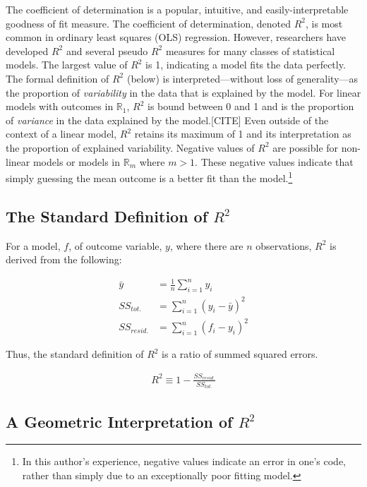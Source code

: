 \documentclass[conference,final,]{IEEEtran}
\begin{document}
The coefficient of determination is a popular, intuitive, and
easily-interpretable goodness of fit measure. The coefficient of
determination, denoted \(R^2\), is most common in ordinary least squares
(OLS) regression. However, researchers have developed \(R^2\) and
several pseudo \(R^2\) measures for many classes of statistical models.
The largest value of \(R^2\) is 1, indicating a model fits the data
perfectly. The formal definition of \(R^2\) (below) is
interpreted---without loss of generality---as the proportion of
\emph{variability} in the data that is explained by the model. For
linear models with outcomes in \(\mathbb{R}_1\), \(R^2\) is bound
between 0 and 1 and is the proportion of \emph{variance} in the data
explained by the model.{[}CITE{]} Even outside of the context of a
linear model, \(R^2\) retains its maximum of 1 and its interpretation as
the proportion of explained variability. Negative values of \(R^2\) are
possible for non-linear models or models in \(\mathbb{R}_m\) where
\(m > 1\). These negative values indicate that simply guessing the mean
outcome is a better fit than the model.\footnote{In this author's
  experience, negative values indicate an error in one's code, rather
  than simply due to an exceptionally poor fitting model.}

\hypertarget{the-standard-definition-of-r2}{%
\subsection{\texorpdfstring{The Standard Definition of
\(R^2\)}{The Standard Definition of R\^{}2}}\label{the-standard-definition-of-r2}}

For a model, \(f\), of outcome variable, \(y\), where there are \(n\)
observations, \(R^2\) is derived from the following:

\begin{align}
  \bar{y} &= \frac{1}{n}\sum_{i=1}^{n}y_i\\
  SS_{tot.} &= \sum_{i=1}^n{(y_i-\bar{y})^2}\\
  SS_{resid.} &= \sum_{i=1}^n{(f_i-y_i)^2}
\end{align}

Thus, the standard definition of \(R^2\) is a ratio of summed squared
errors.

\begin{align}
    R^2 \equiv 1 - \frac{SS_{resid.}}{SS_{tot.}}
\end{align}

\hypertarget{a-geometric-interpretation-of-r2}{%
\subsection{\texorpdfstring{A Geometric Interpretation of
\(R^2\)}{A Geometric Interpretation of R\^{}2}}\label{a-geometric-interpretation-of-r2}}
\end{document}
